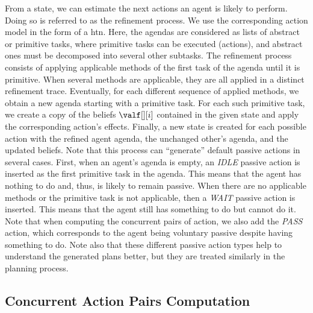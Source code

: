 From a state, we can estimate the next actions an agent is likely to perform. Doing so is referred to as the refinement process. We use the corresponding action model in the form of a \acrfull{htn}. Here, the agendas are considered as lists of abstract or primitive tasks, where primitive tasks can be executed (actions), and abstract ones must be decomposed into several other subtasks. 
The refinement process consists of applying applicable methods of the first task of the agenda until it is primitive. When several methods are applicable, they are all applied in a distinct refinement trace.
Eventually, for each different sequence of applied methods, we obtain a new agenda starting with a primitive task. For each such primitive task, we create a copy of the beliefs $\valf[][i]$ contained in the given state and apply the corresponding action's effects. 
Finally, a new state is created for each possible action with the refined agent agenda, the unchanged other's agenda, and the updated beliefs. 
Note that this process can ``generate'' default passive actions in several cases. First, when an agent's agenda is empty, an \textit{IDLE} passive action is inserted as the first primitive task in the agenda. This means that the agent has nothing to do and, thus, is likely to remain passive. When there are no applicable methods or the primitive task is not applicable, then a \textit{WAIT} passive action is inserted. This means that the agent still has something to do but cannot do it. Note that when computing the concurrent pairs of action, we also add the \textit{PASS} action, which corresponds to the agent being voluntary passive despite having something to do. Note also that these different passive action types help to understand the generated plans better, but they are treated similarly in the planning process.

    \subsection*{Concurrent Action Pairs Computation}


